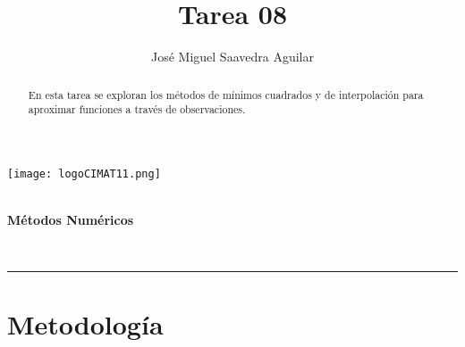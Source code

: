 
\author{José Miguel Saavedra Aguilar}
\title{Tarea 08}


\pagestyle{plain}

\setlength{\parskip}{10pt}
\setlength{\parindent}{5pt}
\begin{minipage}{0.2\linewidth}
\vspace{-1cm}
\texttt{[image: logoCIMAT11.png]}
\end{minipage}
\begin{minipage}{0.7\linewidth}
\vspace{-1cm}
\\
\textbf{Métodos Numéricos}
\end{minipage}
\vspace{-5mm}
\begin{center}
\textbf{\large \thetitle}\\   %
\vspace{3mm}
\theauthor
\end{center}
\vspace{-5mm}
\rule{\linewidth}{0.1mm}

\begin{abstract}
En esta tarea se exploran los métodos de mínimos cuadrados y de interpolación para aproximar funciones a través de observaciones.
\end{abstract}
\section{Metodología}
